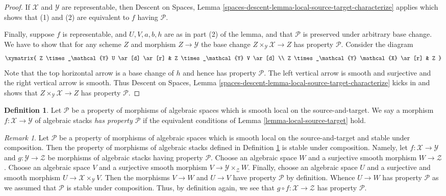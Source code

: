 \documentclass{stacks-project}
\theoremstyle{plain}
\theoremstyle{definition}
\newtheorem{definition}[subsection]{Definition}
\theoremstyle{remark}
\newtheorem{remark}[subsection]{Remark}
\numberwithin{equation}{subsection}
\begin{document}
\begin{proof}
\medskip\noindent
If $\mathcal{X}$ and $\mathcal{Y}$ are representable, then
Descent on Spaces,
Lemma \ref{spaces-descent-lemma-local-source-target-characterize}
applies which shows that (1) and (2) are equivalent to $f$ having
$\mathcal{P}$.

\medskip\noindent
Finally, suppose $f$ is representable, and $U, V, a, b, h$ are
as in part (2) of the lemma, and that $\mathcal{P}$ is preserved under
arbitrary base change. We have to show that for any scheme
$Z$ and morphism $Z \to \mathcal{Y}$ the base change
$Z \times_\mathcal{Y} \mathcal{X} \to Z$
has property $\mathcal{P}$. Consider the diagram
$$
\xymatrix{
Z \times_\mathcal{Y} U \ar[d] \ar[r] &
Z \times_\mathcal{Y} V \ar[d] \\
Z \times_\mathcal{Y} \mathcal{X} \ar[r] &
Z
}
$$
Note that the top horizontal arrow is a base change of $h$ and
hence has property $\mathcal{P}$. The left vertical arrow is smooth
and surjective and the right vertical arrow is smooth. Thus
Descent on Spaces,
Lemma \ref{spaces-descent-lemma-local-source-target-characterize}
kicks in and shows that $Z \times_\mathcal{Y} \mathcal{X} \to Z$
has property $\mathcal{P}$.
\end{proof}

\begin{definition}
\label{definition-P}
Let $\mathcal{P}$ be a property of morphisms of algebraic spaces
which is smooth local on the source-and-target.
We say a morphism $f : \mathcal{X} \to \mathcal{Y}$ of algebraic stacks
{\it has property $\mathcal{P}$} if the equivalent conditions of
Lemma \ref{lemma-local-source-target}
hold.
\end{definition}

\begin{remark}
\label{remark-composition}
Let $\mathcal{P}$ be a property of morphisms of algebraic spaces
which is smooth local on the source-and-target and stable under composition.
Then the property of morphisms of algebraic stacks defined in
Definition \ref{definition-P}
is stable under composition. Namely, let $f : \mathcal{X} \to \mathcal{Y}$
and $g : \mathcal{Y} \to \mathcal{Z}$ be morphisms of algebraic stacks
having property $\mathcal{P}$. Choose an algebraic space $W$ and a
surjective smooth morphism $W \to \mathcal{Z}$. Choose an algebraic space
$V$ and a surjective smooth morphism $V \to \mathcal{Y} \times_\mathcal{Z} W$.
Finally, choose an algebraic space $U$ and a surjective and smooth morphism
$U \to \mathcal{X} \times_\mathcal{Y} V$. Then the morphisms
$V \to W$ and $U \to V$ have property $\mathcal{P}$ by definition.
Whence $U \to W$ has property $\mathcal{P}$ as we assumed that
$\mathcal{P}$ is stable under composition. Thus, by definition again,
we see that $g \circ f : \mathcal{X} \to \mathcal{Z}$ has
property $\mathcal{P}$.
\end{remark}
\end{document}
